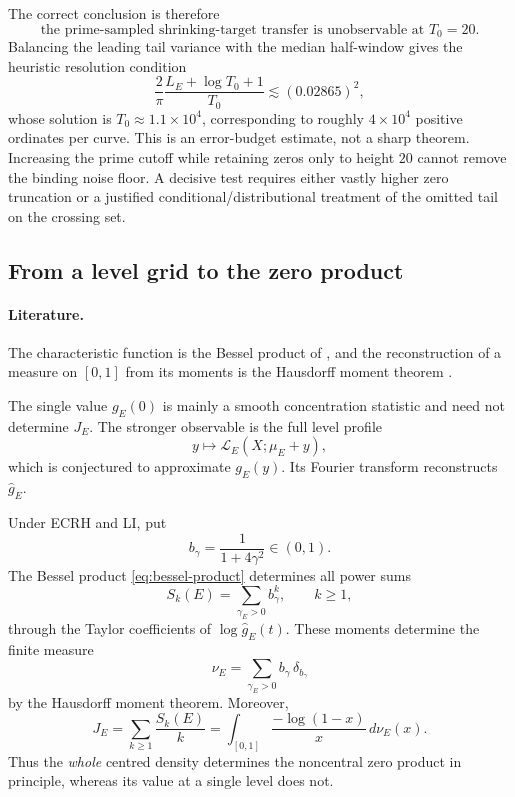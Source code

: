 \documentclass[11pt,reqno]{amsart}
\theoremstyle{remark}
\begin{document}
The correct conclusion is therefore
\begin{equation}
  \boxed{
  \text{the prime-sampled shrinking-target transfer is unobservable at }T_0=20.
  }
  \label{eq:unobservable-T20}
\end{equation}
Balancing the leading tail variance with the median half-window gives the heuristic resolution condition
\begin{equation}
  \frac{2}{\pi}\frac{L_E+\log T_0+1}{T_0}
  \lesssim(0.02865)^2,
\end{equation}
whose solution is $T_0\approx1.1\times10^4$, corresponding to roughly $4\times10^4$ positive ordinates per curve.  This is an error-budget estimate, not a sharp theorem.  Increasing the prime cutoff while retaining zeros only to height $20$ cannot remove the binding noise floor.  A decisive test requires either vastly higher zero truncation or a justified conditional/distributional treatment of the omitted tail on the crossing set.

\subsection{From a level grid to the zero product}

\paragraph{Literature.}
The characteristic function is the Bessel product of \cite{RubinsteinSarnak1994,ANS2014}, and the reconstruction of a measure on $[0,1]$ from its moments is the Hausdorff moment theorem \cite{ShohatTamarkin1943}.

The single value $g_E(0)$ is mainly a smooth concentration statistic and need not determine $J_E$.  The stronger observable is the full level profile
\begin{equation}
  y\longmapsto \mathcal L_E(X;\mu_E+y),
  \label{eq:level-profile}
\end{equation}
which is conjectured to approximate $g_E(y)$.  Its Fourier transform reconstructs $\widehat g_E$.

Under ECRH and LI, put
\begin{equation}
  b_\gamma=\frac{1}{1+4\gamma^2}\in(0,1).
\end{equation}
The Bessel product \eqref{eq:bessel-product} determines all power sums
\begin{equation}
  S_k(E)=\sum_{\gamma_E>0}b_\gamma^k,
  \qquad k\ge1,
  \label{eq:power-sums}
\end{equation}
through the Taylor coefficients of $\log\widehat g_E(t)$.  These moments determine the finite measure
\begin{equation}
  \nu_E=\sum_{\gamma_E>0}b_\gamma\,\delta_{b_\gamma}
\end{equation}
by the Hausdorff moment theorem.  Moreover,
\begin{equation}
  \boxed{
  J_E=\sum_{k\ge1}\frac{S_k(E)}{k}
  =\int_{[0,1]}
   \frac{-\log(1-x)}{x}\,d\nu_E(x).
  }
  \label{eq:J-from-density}
\end{equation}
Thus the \emph{whole} centred density determines the noncentral zero product in principle, whereas its value at a single level does not.
\end{document}
